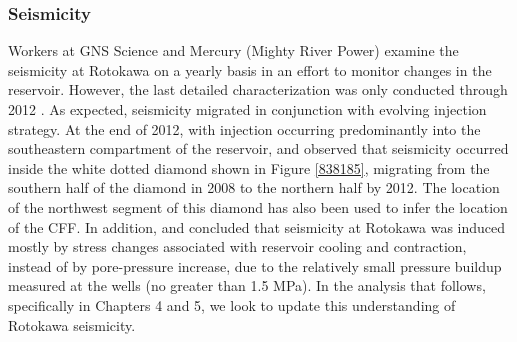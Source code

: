 \subsubsection{Seismicity}
Workers at GNS Science and Mercury (Mighty River Power) examine the seismicity at Rotokawa on a yearly basis in an effort to monitor changes in the reservoir. However, the last detailed characterization was only conducted through 2012 \citep{Sewell_2015WGC,Sherburn_2015}. As expected, seismicity migrated in conjunction with evolving injection strategy. At the end of 2012, with injection occurring predominantly into the southeastern compartment of the reservoir, \citet{Sewell_2015WGC} and \citet{Sherburn_2015} observed that seismicity occurred inside the white dotted diamond shown in Figure \ref{838185}, migrating from the southern half of the diamond in 2008 to the northern half by 2012. The location of the northwest segment of this diamond has also been used to infer the location of the \acrshort{CFF}. In addition, \citet{Sewell_2015WGC} and \citet{Sherburn_2015} concluded that seismicity at Rotokawa was induced mostly by stress changes associated with reservoir cooling and contraction, instead of by pore-pressure increase, due to the relatively small pressure buildup measured at the wells (no greater than 1.5 \acrshort{MPa}). In the analysis that follows, specifically in Chapters 4 and 5, we look to update this understanding of Rotokawa seismicity.

